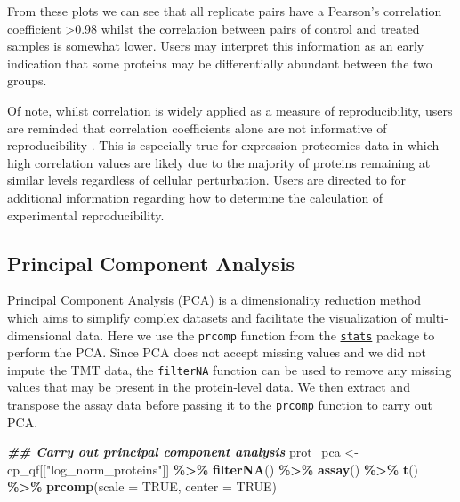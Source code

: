 \documentclass[9pt,a4paper,]{extarticle}
\newenvironment{Shaded}{\begin{snugshade}}{\end{snugshade}}
\newcommand{\AttributeTok}[1]{\textcolor[rgb]{0.13,0.29,0.53}{#1}}
\newcommand{\ConstantTok}[1]{\textcolor[rgb]{0.56,0.35,0.01}{#1}}
\newcommand{\DocumentationTok}[1]{\textcolor[rgb]{0.56,0.35,0.01}{\textbf{\textit{#1}}}}
\newcommand{\FunctionTok}[1]{\textcolor[rgb]{0.13,0.29,0.53}{\textbf{#1}}}
\newcommand{\NormalTok}[1]{#1}
\newcommand{\OtherTok}[1]{\textcolor[rgb]{0.56,0.35,0.01}{#1}}
\newcommand{\SpecialCharTok}[1]{\textcolor[rgb]{0.81,0.36,0.00}{\textbf{#1}}}
\newcommand{\StringTok}[1]{\textcolor[rgb]{0.31,0.60,0.02}{#1}}
\begin{document}
From these plots we can see that all replicate pairs have a Pearson's correlation
coefficient \textgreater0.98 whilst the correlation between pairs of control and treated
samples is somewhat lower. Users may interpret this information as an early
indication that some proteins may be differentially abundant between the two
groups.

Of note, whilst correlation is widely applied as a measure of reproducibility,
users are reminded that correlation coefficients alone are not informative of
reproducibility \citep{simply_stats, Bunting2019}. This is especially true for
expression proteomics data in which high correlation values are likely due to
the majority of proteins remaining at similar levels regardless of cellular
perturbation. Users are directed to \citep{Darbani2014} for additional information
regarding how to determine the calculation of experimental reproducibility.

\hypertarget{principal-component-analysis}{%
\subsection{Principal Component Analysis}\label{principal-component-analysis}}

Principal Component Analysis (PCA) is a dimensionality reduction method which
aims to simplify complex datasets and facilitate the visualization of
multi-dimensional data. Here we use the \texttt{prcomp} function from the
\href{https://stat.ethz.ch/R-manual/R-devel/library/stats/html/00Index.html}{\texttt{stats}}
package to perform the PCA. Since PCA does not accept missing values and we did
not impute the TMT data, the \texttt{filterNA} function can be used to remove any
missing values that may be present in the protein-level data. We then extract
and transpose the assay data before passing it to the \texttt{prcomp} function to carry
out PCA.

\begin{Shaded}
\begin{Highlighting}[]
\DocumentationTok{\#\# Carry out principal component analysis}
\NormalTok{prot\_pca }\OtherTok{\textless{}{-}}\NormalTok{ cp\_qf[[}\StringTok{"log\_norm\_proteins"}\NormalTok{]] }\SpecialCharTok{\%\textgreater{}\%}
  \FunctionTok{filterNA}\NormalTok{() }\SpecialCharTok{\%\textgreater{}\%}
  \FunctionTok{assay}\NormalTok{() }\SpecialCharTok{\%\textgreater{}\%}
  \FunctionTok{t}\NormalTok{() }\SpecialCharTok{\%\textgreater{}\%}
  \FunctionTok{prcomp}\NormalTok{(}\AttributeTok{scale =} \ConstantTok{TRUE}\NormalTok{, }\AttributeTok{center =} \ConstantTok{TRUE}\NormalTok{)}
\end{Highlighting}
\end{Shaded}
\end{document}
